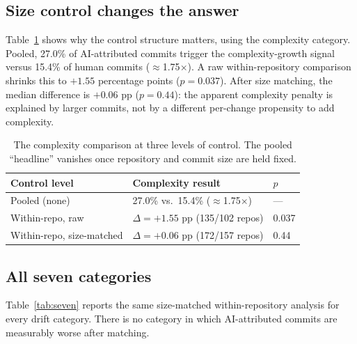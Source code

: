 \documentclass[sigplan,11pt,nonacm=true]{acmart}
\newcommand{\x}{$\times$}
\begin{document}
\subsection{Size control changes the answer}

Table~\ref{tab:ladder} shows why the control structure matters, using the
complexity category. Pooled, 27.0\% of AI-attributed commits trigger the
complexity-growth signal versus 15.4\% of human commits ($\approx$1.75\x).
A raw within-repository comparison shrinks this to $+1.55$ percentage points
($p=0.037$). After size matching, the median difference is $+0.06$ pp
($p=0.44$): the apparent complexity penalty is explained by larger commits,
not by a different per-change propensity to add complexity.

\begin{table}[t]
\caption{The complexity comparison at three levels of control. The pooled
``headline'' vanishes once repository and commit size are held fixed.}
\label{tab:ladder}
\footnotesize
\setlength{\tabcolsep}{4pt}
\begin{tabular}{@{}lll@{}}
\toprule
Control level & Complexity result & $p$ \\
\midrule
Pooled (none) & 27.0\% vs.\ 15.4\% ($\approx$1.75\x) & --- \\
Within-repo, raw & $\Delta = +1.55$ pp (135/102 repos) & 0.037 \\
Within-repo, size-matched & $\Delta = +0.06$ pp (172/157 repos) & 0.44 \\
\bottomrule
\end{tabular}
\end{table}

\subsection{All seven categories}

Table~\ref{tab:seven} reports the same size-matched within-repository analysis
for every drift category. There is no category in which AI-attributed commits
are measurably worse after matching.
\end{document}
